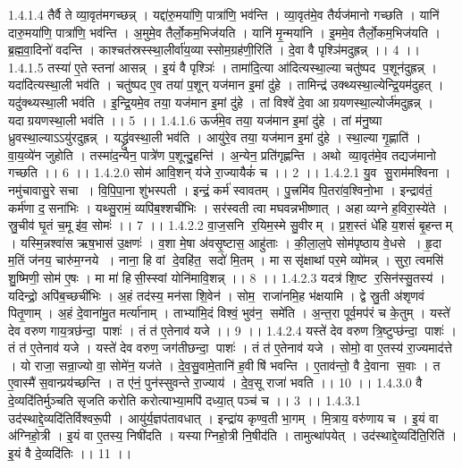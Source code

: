 1.4.1.4
तैर्वै ते व्या॒वृत॑मगच्छन्न् । यद्दा॑रु॒मया॑णि॒ पात्रा॑णि॒ भव॑न्ति । व्या॒वृत॑मे॒व तैर्यज॑मानो गच्छति । यानि॑ दारु॒मया॑णि॒ पात्रा॑णि॒ भव॑न्ति । अ॒मुमे॒व तैर्लो॒कम॒भिज॑यति । यानि॑ मृ॒न्मया॑नि । इ॒ममे॒व तैर्लो॒कम॒भिज॑यति । ब्र॒ह्म॒वा॒दिनो॑ वदन्ति । काश्चत॑स्रस्स्था॒लीर्वा॑य॒व्यास्सोम॒ग्रह॑णी॒रिति॑ । दे॒वा वै पृश्ञि॑मदुह्रन्न् ।। 4 ।।
1.4.1.5
तस्या॑ ए॒ते स्तना॑ आसन्न् । इ॒यं वै पृश्ञिः॑ । तामा॑दि॒त्या आ॑दित्यस्था॒ल्या चतु॑ष्पद प॒शून॑दुह्रन्न् । यदा॑दित्यस्था॒ली भव॑ति । चतु॑ष्पद ए॒व तया॑ प॒शून् यज॑मान इ॒मां दु॑हे । तामिन्द्र॑ उक्थ्यस्था॒ल्येन्द्रि॒यम॑दुहत् । यदु॑क्थ्यस्था॒ली भव॑ति । इ॒न्द्रि॒यमे॒व तया॒ यज॑मान इ॒मां दु॑हे । तां विश्वे॑ दे॒वा आग्रयणस्था॒ल्योर्ज॑मदुह्रन्न् । यदाग्रयणस्था॒ली भव॑ति ।। 5 ।।
1.4.1.6
ऊर्ज॑मे॒व तया॒ यज॑मान इ॒मां दु॑हे । तां म॑नु॒ष्या ध्रुवस्था॒ल्याऽऽयु॑रदुह्रन्न् । यद्ध्रु॑वस्था॒ली भव॑ति । आयु॑रे॒व तया॒ यज॑मान इ॒मां दु॑हे । स्था॒ल्या गृ॒ह्णाति॑ । वा॒य॒व्ये॑न जुहोति । तस्मा॑द॒न्येन॒ पात्रे॑ण प॒शून्दु॒हन्ति॑ । अ॒न्येन॒ प्रति॑गृह्णन्ति । अथो व्या॒वृत॑मे॒व तद्यज॑मानो गच्छति ।। 6 ।।
1.4.2.0
सोम॑ आवि॒शन् य॑जे रा॒ज्यायैकं॑ च ।। 2 ।।
1.4.2.1
यु॒व सु॒राम॑मश्विना । नमु॑चावासु॒रे सचा । वि॒पि॒पा॒ना शु॑भस्पती । इन्द्रं॒ कर्म॑ स्वावतम् । पु॒त्त्रमि॑व पि॒तरा॑व॒श्विनो॒भा । इन्द्राव॑तं॒ कर्म॑णा द॒॒सना॑भिः । यथ्सु॒रामं॒ व्यपि॑ब॒श्शची॑भिः । सर॑स्वती त्वा मघवन्नभीष्णात् । अहाव्यग्ने ह॒विरा॒स्ये॑ते । स्रु॒चीव॑ घृ॒तं च॒मू इ॑व॒ सोमः॑ ।। 7 ।।
1.4.2.2
वा॒ज॒सनि॑ र॒यिम॒स्मे सु॒वीरम् । प्र॒श॒स्तं धे॑हि य॒शसं॑ बृ॒हन्तम् । यस्मि॒न्नश्वा॑स ऋष॒भास॑ उ॒क्षणः॑ । व॒शा मे॒षा अ॑वसृ॒ष्टास॒ आहु॑ताः । की॒ला॒ल॒पे सोम॑पृष्ठाय वे॒धसे । हृ॒दा म॒तिं ज॑नय॒ चारु॑म॒ग्नये । नाना॒ हि वां दे॒वहि॑त॒॒ सदो॑ मि॒तम् । मा ससृ॑क्षाथां पर॒मे व्यो॑मन्न् । सुरा॒ त्वमसि॑ शु॒ष्मिणी॒ सोम॑ ए॒षः । मा मा॑ हिसी॒स्स्वां योनि॑मावि॒शन्न् ।। 8 ।।
1.4.2.3
यदत्र॑ शि॒ष्ट र॒सिन॑स्सु॒तस्य॑ । यदिन्द्रो॒ अपि॑ब॒च्छची॑भिः । अ॒हं तद॑स्य॒ मन॑सा शि॒वेन॑ । सोम॒॒ राजा॑नमि॒ह भ॑क्षयामि । द्वे स्रु॒ती अ॑शृणवं पितृ॒णाम् । अ॒हं दे॒वाना॑मु॒त मर्त्या॑नाम् । ताभ्या॑मि॒दं विश्वं॒ भुव॑न॒॒ समे॑ति । अ॒न्त॒रा पूर्व॒मप॑रं च के॒तुम् । यस्ते॑ देव वरुण गाय॒त्रछ॑न्दा॒ पाशः॑ । तं त॑ ए॒तेनाव॑ यजे ।। 9 ।।
1.4.2.4
यस्ते॑ देव वरुण त्रि॒ष्टुप्छ॑न्दा॒ पाशः॑ । तं त॑ ए॒तेनाव॑ यजे । यस्ते॑ देव वरुण॒ जग॑तीछन्दा॒ पाशः॑ । तं त॑ ए॒तेनाव॑ यजे । सोमो॒ वा ए॒तस्य॑ रा॒ज्यमाद॑त्ते । यो राजा॒ सन्रा॒ज्यो वा॒ सोमे॑न॒ यज॑ते । दे॒व॒सु॒वामे॒तानि॑ ह॒वीषि॑ भवन्ति । ए॒ताव॑न्तो॒ वै दे॒वाना॑ स॒वाः । त ए॒वास्मै॑ स॒वान्प्रय॑च्छन्ति । त ए॑नं॒ पुन॑स्सुवन्ते रा॒ज्याय॑ । दे॒व॒सू राजा॑ भवति ।। 10 ।।
1.4.3.0
वै दे॒व्यदि॑तिर्मुञ्चति सृजति करोति करोत्याभ्या॒मपि॑ दध्या॒त् पञ्च॑ च ।। 3 ।।
1.4.3.1
उद॑स्थाद्दे॒व्यदि॑तिर्विश्वरू॒पी । आयु॑र्य॒ज्ञप॑तावधात् । इन्द्रा॑य कृण्व॒ती भा॒गम् । मि॒त्राय॒ वरु॑णाय च । इ॒यं वा अ॑ग्निहो॒त्री । इ॒यं वा ए॒तस्य॒ निषी॑दति । यस्याग्निहो॒त्री नि॒षीद॑ति । तामुत्था॑पयेत् । उद॑स्थाद्दे॒व्यदि॑ति॒रिति॑ । इ॒यं वै दे॒व्यदि॑तिः ।। 11 ।।
